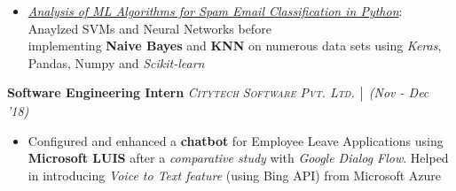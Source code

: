 \documentclass{article}
\begin{document}
\vspace{-19pt}
\begin{itemize}[itemsep = -1 mm, leftmargin=*]
    \item \underline{\it Analysis of ML Algorithms for Spam Email Classification in Python}: Anaylzed SVMs and Neural Networks before\\implementing {\bf Naive Bayes} and {\bf KNN} on numerous data sets using {\it Keras}, Pandas, Numpy and {\it Scikit-learn}
\end{itemize}
\vspace{-5pt}
\textbf{Software Engineering Intern} \hfill{\sl \small \textsc{Citytech Software Pvt. Ltd.} $\bigm|$ (Nov - Dec '18)}\\
\vspace{-19pt}
\begin{itemize}[itemsep = -1 mm, leftmargin=*]
  \item Configured and enhanced a {\bf chatbot} for Employee Leave Applications using {\bf Microsoft LUIS} after a {\sl comparative study} with {\it Google Dialog Flow}. Helped in introducing \textsl{Voice to Text feature} (using Bing API) from Microsoft Azure
\end{itemize}


\vspace{-20pt}
\end{document}
